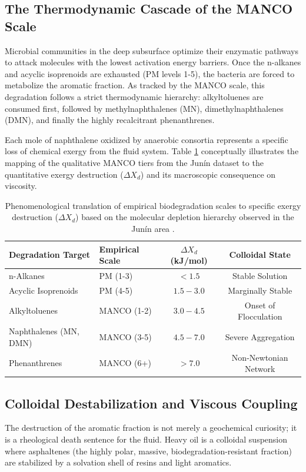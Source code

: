 \documentclass[review,12pt]{elsarticle}
\begin{document}
\subsection{The Thermodynamic Cascade of the MANCO Scale}
Microbial communities in the deep subsurface optimize their enzymatic pathways to attack molecules with the lowest activation energy barriers. Once the n-alkanes and acyclic isoprenoids are exhausted (PM levels 1-5), the bacteria are forced to metabolize the aromatic fraction. As tracked by the MANCO scale, this degradation follows a strict thermodynamic hierarchy: alkyltoluenes are consumed first, followed by methylnaphthalenes (MN), dimethylnaphthalenes (DMN), and finally the highly recalcitrant phenanthrenes. 

Each mole of naphthalene oxidized by anaerobic consortia represents a specific loss of chemical exergy from the fluid system. Table \ref{tab:manco} conceptually illustrates the mapping of the qualitative MANCO tiers from the Jun\'in dataset to the quantitative exergy destruction ($\Delta X_d$) and its macroscopic consequence on viscosity.

\begin{table}[htpb]
\centering
\caption{Phenomenological translation of empirical biodegradation scales to specific exergy destruction ($\Delta X_d$) based on the molecular depletion hierarchy observed in the Jun\'in area \cite{lopez2014}.}
\label{tab:manco}
\begin{tabular}{@{}llcc@{}}
\toprule
\textbf{Degradation Target} & \textbf{Empirical Scale} & \textbf{$\Delta X_d$ (kJ/mol)} & \textbf{Colloidal State} \\ \midrule
n-Alkanes & PM (1-3) & $< 1.5$ & Stable Solution \\
Acyclic Isoprenoids & PM (4-5) & $1.5 - 3.0$ & Marginally Stable \\
Alkyltoluenes & MANCO (1-2) & $3.0 - 4.5$ & Onset of Flocculation \\
Naphthalenes (MN, DMN) & MANCO (3-5) & $4.5 - 7.0$ & Severe Aggregation \\
Phenanthrenes & MANCO (6+) & $> 7.0$ & Non-Newtonian Network \\ \bottomrule
\end{tabular}
\end{table}

\subsection{Colloidal Destabilization and Viscous Coupling}
The destruction of the aromatic fraction is not merely a geochemical curiosity; it is a rheological death sentence for the fluid. Heavy oil is a colloidal suspension where asphaltenes (the highly polar, massive, biodegradation-resistant fraction) are stabilized by a solvation shell of resins and light aromatics. 
\end{document}
